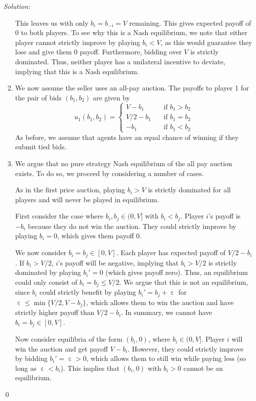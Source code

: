 \documentclass[12pt]{article}
\DeclareMathOperator{\eps}{\varepsilon}
\newenvironment{sol}
    {\emph{Solution:}
    }
    {
    \qed
    }
\begin{document}
\begin{sol}
\begin{enumerate}[label=\alph*) ]
    This leaves us with only $b_i = b_{-i} = V$ remaining. This gives expected payoff of 0 to both players. To see why this is a Nash equilibrium, we note that either player cannot strictly improve by playing $b_i < V$, as this would guarantee they lose and give them 0 payoff. Furthermore, bidding over $V$ is strictly dominated. Thus, neither player has a unilateral incentive to deviate, implying that this is a Nash equilibrium.
    \item We now assume the seller uses an all-pay auction. The payoffs to player 1 for the pair of bids $(b_1, b_2)$ are given by 
    \[u_1(b_1, b_2) = \begin{cases} V - b_1 &\quad\text{if } b_1 > b_2\\
        V/2 - b_1&\quad\text{if } b_1 = b_2\\
        - b_1 &\quad\text{if } b_1 < b_2
    \end{cases}\]
    As before, we assume that agents have an equal chance of winning if they submit tied bids.
    \item We argue that no pure strategy Nash equilibrium of the all pay auction exists. To do so, we proceed by considering a number of cases.
    
    As in the first price auction, playing $b_i > V$ is strictly dominated for all players and will never be played in equilibrium. 

    First consider the case where $b_i, b_j \in (0,V]$ with $b_i < b_j$. Player $i$'s payoff is $-b_i$ because they do not win the auction. They could strictly improve by playing $b_i = 0$, which gives them payoff 0.

    We now consider $b_i = b_j \in [0,V]$. Each player has expected payoff of $V/2 - b_i$. If $b_i > V/2$, $i$'s payoff will be negative, implying that $b_i > V/2$ is strictly dominated by playing $b_i' = 0$ (which gives payoff zero). Thus, an equilibrium could only consist of $b_i = b_j \leq V/2$. We argue that this is not an equilibrium, since $b_i$ could strictly benefit by playing $b_i' = b_j + \eps$ for $\eps \leq \min\{V/2, V-b_j\}$, which allows them to win the auction and have strictly higher payoff than $V/2 - b_i$. In summary, we cannot have $b_i = b_j \in [0,V]$.

    Now consider equilibria of the form $(b_i, 0)$, where $b_i \in (0, V]$. Player $i$ will win the auction and get payoff $V - b_i$. However, they could strictly improve by bidding $b_i' = \eps > 0$, which allows them to still win while paying less (so long as $\eps < b_i$). This implies that $(b_i, 0)$ with $b_i > 0$ cannot be an equilibrium.
    

\end{enumerate}
\end{sol}
\end{document}
